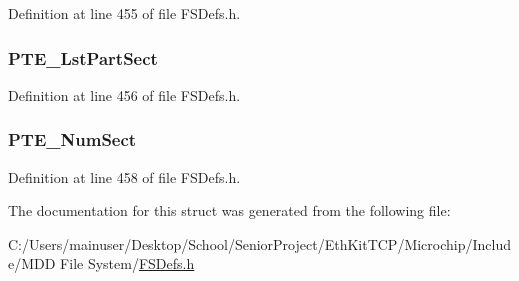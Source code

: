 Definition at line 455 of file F\+S\+Defs.\+h.

\hypertarget{struct_p_t_e___m_b_r_a0bebc7b413ddd78e42e5fd36224ec0e7}{}
\subsubsection[{P\+T\+E\+\_\+\+Lst\+Part\+Sect}]{ P\+T\+E\+\_\+\+Lst\+Part\+Sect}\label{struct_p_t_e___m_b_r_a0bebc7b413ddd78e42e5fd36224ec0e7}


Definition at line 456 of file F\+S\+Defs.\+h.

\hypertarget{struct_p_t_e___m_b_r_a4e55f721dcd1bbba2865333be9589a89}{}
\subsubsection[{P\+T\+E\+\_\+\+Num\+Sect}]{ P\+T\+E\+\_\+\+Num\+Sect}\label{struct_p_t_e___m_b_r_a4e55f721dcd1bbba2865333be9589a89}


Definition at line 458 of file F\+S\+Defs.\+h.



The documentation for this struct was generated from the following file\+:\begin{DoxyCompactItemize}
\item 
C\+:/\+Users/mainuser/\+Desktop/\+School/\+Senior\+Project/\+Eth\+Kit\+T\+C\+P/\+Microchip/\+Include/\+M\+D\+D File System/\hyperlink{_f_s_defs_8h}{F\+S\+Defs.\+h}\end{DoxyCompactItemize}
